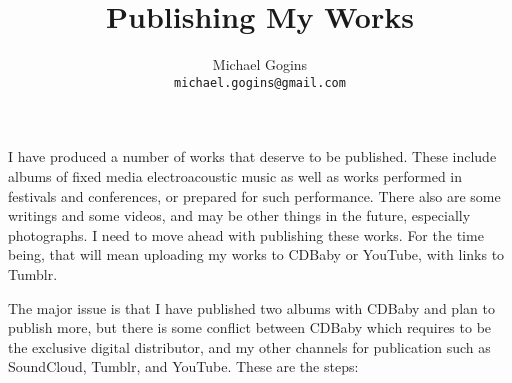 \documentclass[english,11pt,letterpaper,onecolumn]{scrartcl}
\begin{document}
\title{Publishing My Works}
\author{Michael Gogins \\ \texttt{michael.gogins@gmail.com}}
\maketitle


I have produced a number of works that deserve to be published. These include albums of fixed media electroacoustic music as well as works performed in festivals and conferences, or prepared for such performance. There also are some writings and some videos, and may be other things in the future, especially photographs. I need to move ahead with publishing these works. For the time being, that will mean uploading my works to CDBaby or YouTube, with links to Tumblr.


The major issue is that I have published two albums with CDBaby and plan to publish more, but there is some conflict between CDBaby which requires to be the exclusive digital distributor, and my other channels for publication such as SoundCloud, Tumblr, and YouTube. These are the steps:
\end{document}
